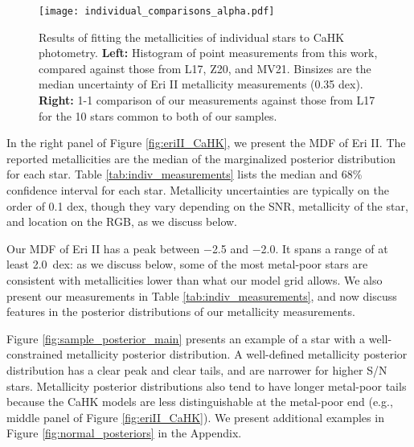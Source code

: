 \documentclass[twocolumn]{aastex63}
\begin{document}
\begin{figure*}
    \centering
    \texttt{[image: individual\_comparisons\_alpha.pdf]}
    \caption{Results of fitting the metallicities of individual stars to CaHK photometry. \textbf{Left:} Histogram of point measurements from this work, compared against those from L17, Z20, and MV21. Binsizes are the median uncertainty of Eri II metallicity measurements (0.35 dex). \textbf{Right:} 1-1 comparison of our measurements against those from L17 for the 10 stars common to both of our samples.}
    \label{fig:indiv_histograms}
\end{figure*}

\par In the right panel of Figure \ref{fig:eriII_CaHK}, we present the MDF of Eri II.  The reported metallicities are the median of the marginalized posterior distribution for each star.  Table \ref{tab:indiv_measurements} lists the median and 68\% confidence interval for each star.  Metallicity uncertainties are typically on the order of 0.1 dex, though they vary depending on the SNR, metallicity of the star, and location on the RGB, as we discuss below.

\par Our MDF of Eri II has a peak between $-$2.5 and $-$2.0. It spans a range of at least 2.0~dex: as we discuss below, some of the most metal-poor stars are consistent with metallicities lower than what our model grid allows. We also present our measurements in Table \ref{tab:indiv_measurements}, and now discuss features in the posterior distributions of our metallicity measurements. 

\par Figure \ref{fig:sample_posterior_main} presents an example of a star with a well-constrained metallicity posterior distribution. A well-defined metallicity posterior distribution has a clear peak and clear tails, and are narrower for higher S/N stars. Metallicity posterior distributions also tend to have longer metal-poor tails because the CaHK models are less distinguishable at the metal-poor end (e.g., middle panel of Figure \ref{fig:eriII_CaHK}). We present additional examples in Figure \ref{fig:normal_posteriors} in the Appendix. 
\end{document}
